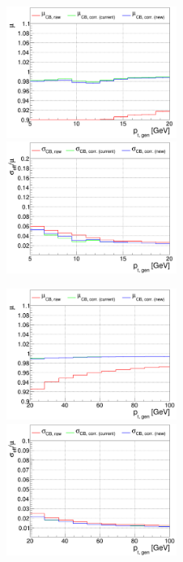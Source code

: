 \begin{figure}
\includegraphics[width=0.495\textwidth]{./plots_pdf/ECAL_plots/plotsPU/EB/FULL/pdf/GENPT/EBFULL_GENPT_0005_0020_MuOverBins.pdf}
\includegraphics[width=0.495\textwidth]{./plots_pdf/ECAL_plots/plotsPU/EB/FULL/pdf/GENPT/EBFULL_GENPT_0005_0020_EffSigmaOverBins.pdf}

\includegraphics[width=0.495\textwidth]{./plots_pdf/ECAL_plots/plotsPU/EB/FULL/pdf/GENPT/EBFULL_GENPT_0020_0100_MuOverBins.pdf}
\includegraphics[width=0.495\textwidth]{./plots_pdf/ECAL_plots/plotsPU/EB/FULL/pdf/GENPT/EBFULL_GENPT_0020_0100_EffSigmaOverBins.pdf}


\end{figure}
